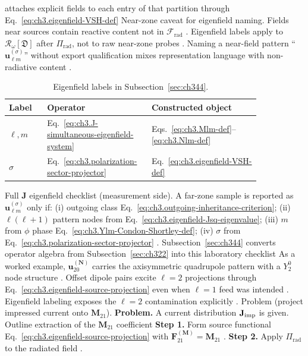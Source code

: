 attaches explicit fields to each entry of that partition through Eq.~\eqref{eq:ch3.eigenfield-VSH-def}
Near-zone caveat for eigenfield naming. Fields near sources contain reactive content not in \(\mathcal{F}_{\mathrm{rad}}\) .
Eigenfield labels apply to \(\mathcal{R}_\omega[\mathfrak{D}]\) after \(\Pi_{\mathrm{rad}}\), not to raw near-zone
probes . Naming a near-field pattern ``\(\mathbf{u}_{\ell m}^{(\sigma)}\)'' without export
qualification mixes representation language with non-radiative content .
\begin{table}[t]
\centering
\caption{Eigenfield labels in Subsection~\ref{sec:ch344}.}
\label{tab:ch3.344-eigenfield-labels}
\small
\begin{tabular}{@{}p{0.14\linewidth}p{0.30\linewidth}p{0.40\linewidth}@{}}
\toprule
Label & Operator & Constructed object \\
\midrule
\(\ell,m\) & Eq.~\eqref{eq:ch3.J-simultaneous-eigenfield-system} & Eqs.~\eqref{eq:ch3.Mlm-def}--\eqref{eq:ch3.Nlm-def} \\
\(\sigma\) & Eq.~\eqref{eq:ch3.polarization-sector-projector} & Eq.~\eqref{eq:ch3.eigenfield-VSH-def} \\
\bottomrule
\end{tabular}
\end{table}
Full \(\mathbf{J}\) eigenfield checklist (measurement side). A far-zone sample is reported as \(\mathbf{u}_{\ell m}^{(\sigma)}\) only if:
(i) outgoing class Eq.~\eqref{eq:ch3.outgoing-inheritance-criterion};
(ii) \(\ell(\ell+1)\) pattern nodes from Eq.~\eqref{eq:ch3.eigenfield-Jsq-eigenvalue};
(iii) \(m\) from \(\phi\) phase Eq.~\eqref{eq:ch3.Ylm-Condon-Shortley-def};
(iv) \(\sigma\) from Eq.~\eqref{eq:ch3.polarization-sector-projector} .
Subsection~\ref{sec:ch344} converts operator algebra from Subsection~\ref{sec:ch322} into this laboratory checklist
As a worked example, \(\mathbf{u}_{20}^{(\mathbf{N})}\) carries the axisymmetric quadrupole pattern with a \(Y_{2}^{0}\) node structure
. Offset dipole pairs excite \(\ell=2\) projections through
Eq.~\eqref{eq:ch3.eigenfield-source-projection} even when \(\ell=1\) feed was intended . Eigenfield
labeling exposes the \(\ell=2\) contamination explicitly .
Problem (project impressed current onto \(\mathbf{M}_{21}\)). \textbf{Problem.} A current distribution \(\mathbf{J}_{\mathrm{imp}}\) is given. Outline extraction of the \(\mathbf{M}_{21}\) coefficient
\textbf{Step 1.} Form source functional Eq.~\eqref{eq:ch3.eigenfield-source-projection} with \(\mathbf{F}_{21}^{(\mathbf{M})}
=\mathbf{M}_{21}\) .
\textbf{Step 2.} Apply \(\Pi_{\mathrm{rad}}\) to the radiated field .
